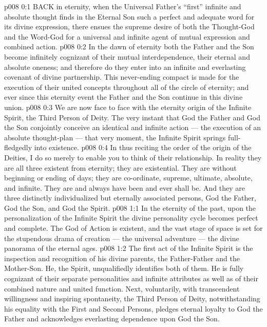 \vs p008 0:1 BACK in eternity, when the Universal Father’s “first” infinite and absolute thought finds in the Eternal Son such a perfect and adequate word for its divine expression, there ensues the supreme desire of both the Thought\hyp{}God and the Word\hyp{}God for a universal and infinite agent of mutual expression and combined action.
\vs p008 0:2 In the dawn of eternity both the Father and the Son become infinitely cognizant of their mutual interdependence, their eternal and absolute oneness; and therefore do they enter into an infinite and everlasting covenant of divine partnership. This never\hyp{}ending compact is made for the execution of their united concepts throughout all of the circle of eternity; and ever since this eternity event the Father and the Son continue in this divine union.
\vs p008 0:3 We are now face to face with the eternity origin of the Infinite Spirit, the Third Person of Deity. The very instant that God the Father and God the Son conjointly conceive an identical and infinite action --- the execution of an absolute thought\hyp{}plan --- that very moment, the Infinite Spirit springs full\hyp{}fledgedly into existence.
\vs p008 0:4 \pc In thus reciting the order of the origin of the Deities, I do so merely to enable you to think of their relationship. In reality they are all three existent from eternity; they are existential. They are without beginning or ending of days; they are co\hyp{}ordinate, supreme, ultimate, absolute, and infinite. They are and always have been and ever shall be. And they are three distinctly individualized but eternally associated persons, God the Father, God the Son, and God the Spirit.
\vs p008 1:1 In the eternity of the past, upon the personalization of the Infinite Spirit the divine personality cycle becomes perfect and complete. The God of Action is existent, and the vast stage of space is set for the stupendous drama of creation --- the universal adventure --- the divine panorama of the eternal ages.
\vs p008 1:2 The first act of the Infinite Spirit is the inspection and recognition of his divine parents, the Father\hyp{}Father and the Mother\hyp{}Son. He, the Spirit, unqualifiedly identifies both of them. He is fully cognizant of their separate personalities and infinite attributes as well as of their combined nature and united function. Next, voluntarily, with transcendent willingness and inspiring spontaneity, the Third Person of Deity, notwithstanding his equality with the First and Second Persons, pledges eternal loyalty to God the Father and acknowledges everlasting dependence upon God the Son.
